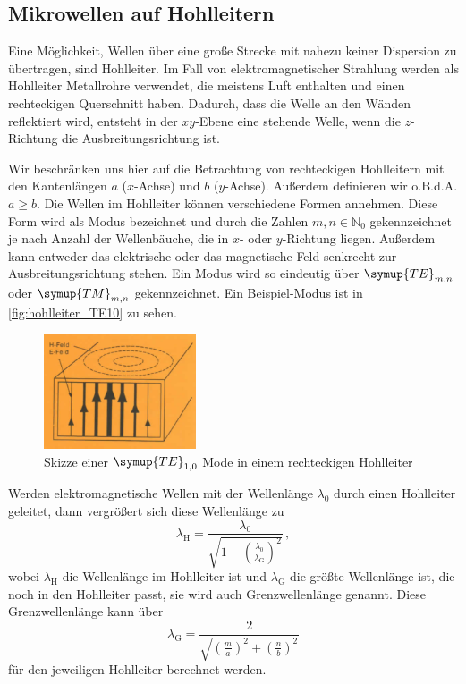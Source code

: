 \subsection{Mikrowellen auf Hohlleitern}
\label{ssec:Hohlleiter}

Eine Möglichkeit, Wellen über eine große Strecke mit nahezu keiner Dispersion zu übertragen, sind Hohlleiter.
Im Fall von elektromagnetischer Strahlung werden als Hohlleiter Metallrohre verwendet, die meistens Luft enthalten und einen rechteckigen Querschnitt haben.
Dadurch, dass die Welle an den Wänden reflektiert wird, entsteht in der $xy$-Ebene eine stehende Welle, wenn die $z$-Richtung die Ausbreitungsrichtung ist.

Wir beschränken uns hier auf die Betrachtung von rechteckigen Hohlleitern mit den Kantenlängen $a$ ($x$-Achse) und $b$ ($y$-Achse).
Außerdem definieren wir o.B.d.A. $a \geq b$.
Die Wellen im Hohlleiter können verschiedene Formen annehmen. 
Diese Form wird als Modus bezeichnet und durch die Zahlen $m,n \in \mathbb{N}_0$ gekennzeichnet je nach Anzahl der Wellenbäuche, die in $x$- oder $y$-Richtung liegen.
Außerdem kann entweder das elektrische oder das magnetische Feld senkrecht zur Ausbreitungsrichtung stehen.
Ein Modus wird so eindeutig über $\symup{TE}_{m,n}$ oder $\symup{TM}_{m,n}$ gekennzeichnet. 
Ein Beispiel-Modus ist in \autoref{fig:hohlleiter_TE10} zu sehen.

\begin{figure}
    \centering
    \includegraphics[width=0.4\textwidth]{images/hohlleiter_TE10.png}
    \caption{Skizze einer $\symup{TE}_{1,0}$ Mode in einem rechteckigen Hohlleiter \cite{V53_old}}
    \label{fig:hohlleiter_TE10}
\end{figure}

Werden elektromagnetische Wellen mit der Wellenlänge $\lambda_0$ durch einen Hohlleiter geleitet,
dann vergrößert sich diese Wellenlänge zu
\begin{equation}
    \lambda_\text{H} = \frac{\lambda_0}{ \sqrt{ 1 - \left( \frac{\lambda_0}{\lambda_\text{G}} \right)^2 } } \, ,
\end{equation}
wobei $\lambda_\text{H}$ die Wellenlänge im Hohlleiter ist und $\lambda_\text{G}$ die größte Wellenlänge ist, die noch in den Hohlleiter passt, sie wird auch Grenzwellenlänge genannt.
Diese Grenzwellenlänge kann über
\begin{equation}
    \lambda_\text{G} = \frac{2}{ \sqrt{ \left( \frac{m}{a} \right)^2 + \left( \frac{n}{b} \right)^2 } }
\end{equation}
für den jeweiligen Hohlleiter berechnet werden.

